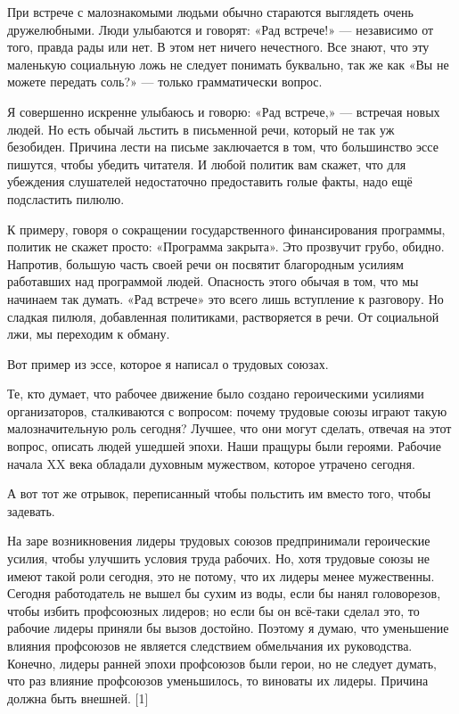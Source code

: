 \documentclass[ebook,12pt,oneside,openany]{memoir}
\date{}
\begin{document}
\maketitle

При встрече с малознакомыми людьми обычно стараются выглядеть очень
дружелюбными. Люди улыбаются и говорят: «Рад встрече!» — независимо от
того, правда рады или нет. В этом нет ничего нечестного. Все знают,
что эту маленькую социальную ложь не следует понимать буквально, так
же как «Вы не можете передать соль?» — только грамматически вопрос.

Я совершенно искренне улыбаюсь и говорю: «Рад встрече,» — встречая
новых людей. Но есть обычай льстить в письменной речи, который не так
уж безобиден. Причина лести на письме заключается в том, что
большинство эссе пишутся, чтобы убедить читателя. И любой политик вам
скажет, что для убеждения слушателей недостаточно предоставить голые
факты, надо ещё подсластить пилюлю.

К примеру, говоря о сокращении государственного финансирования
программы, политик не скажет просто: «Программа закрыта». Это
прозвучит грубо, обидно. Напротив, большую часть своей речи он
посвятит благородным усилиям работавших над программой людей.
Опасность этого обычая в том, что мы начинаем так думать. «Рад
встрече» это всего лишь вступление к разговору. Но сладкая пилюля,
добавленная политиками, растворяется в речи. От социальной лжи, мы
переходим к обману.


Вот пример из эссе, которое я написал о трудовых союзах.

Те, кто думает, что рабочее движение было создано героическими
усилиями организаторов, сталкиваются с вопросом: почему трудовые союзы
играют такую малозначительную роль сегодня? Лучшее, что они могут
сделать, отвечая на этот вопрос, описать людей ушедшей эпохи. Наши
пращуры были героями. Рабочие начала XX века обладали духовным
мужеством, которое утрачено сегодня.


А вот тот же отрывок, переписанный чтобы польстить им вместо того,
чтобы задевать.

На заре возникновения лидеры трудовых союзов предпринимали героические
усилия, чтобы улучшить условия труда рабочих. Но, хотя трудовые союзы
не имеют такой роли сегодня, это не потому, что их лидеры менее
мужественны. Сегодня работодатель не вышел бы сухим из воды, если бы
нанял головорезов, чтобы избить профсоюзных лидеров; но если бы он
всё-таки сделал это, то рабочие лидеры приняли бы вызов достойно.
Поэтому я думаю, что уменьшение влияния профсоюзов не является
следствием обмельчания их руководства. Конечно, лидеры ранней эпохи
профсоюзов были герои, но не следует думать, что раз влияние
профсоюзов уменьшилось, то виноваты их лидеры. Причина должна быть
внешней. [1]
\end{document}
